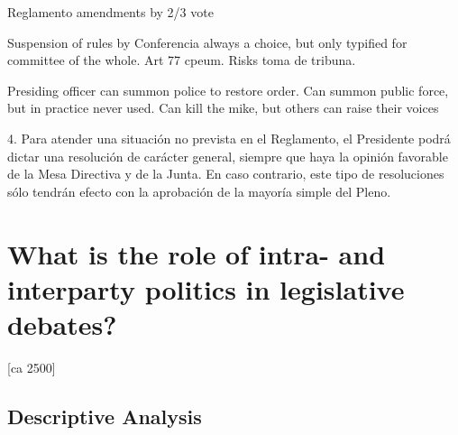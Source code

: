 \documentclass[letter,12pt]{article}
\begin{document}
Reglamento amendments by 2/3 vote

Suspension of rules by Conferencia always a choice, but only typified for committee of the whole. Art 77 cpeum. Risks toma de tribuna.

Presiding officer can summon police to restore order. 
Can summon public force, but in practice never used. 
Can kill the mike, but others can raise their voices

4. Para atender una situación no prevista en el Reglamento, el Presidente podrá dictar una resolución de carácter general, siempre que haya la opinión favorable de la Mesa Directiva y de la Junta. En caso contrario, este tipo de resoluciones sólo tendrán efecto con la aprobación de la mayoría simple del Pleno.

\section{What is the role of intra- and interparty politics in legislative debates?} [ca 2500]


  \subsection{Descriptive Analysis}

\end{document}
